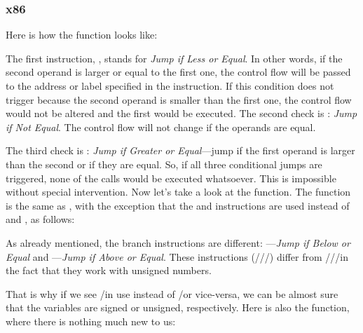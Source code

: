 \subsubsection{x86}


Here is how the  function looks like:




The first instruction, \JLE, stands for \emph{Jump if Less or Equal}. 
In other words, if the second operand is 
larger or equal to the first one, the control flow will be passed to the address or label specified in the instruction.
If this condition does not trigger because the second operand is smaller than the first one, the control flow would not be altered and the first \printf would be executed.
The second check is \JNE: \emph{Jump if Not Equal}.
The control flow will not change if the operands are equal.

The third check is \JGE: \emph{Jump if Greater or Equal}---jump if the first operand is larger than 
the second or if they are equal.
So, if all three conditional jumps are triggered, none of the \printf calls would be executed whatsoever. 
This is impossible without special intervention.
Now let's take a look at the  function.
The  function is the same as , with the exception that the \JBE and \JAE instructions
are used instead of \JLE and \JGE, as follows:




As already mentioned, the branch instructions are different:
\JBE---\emph{Jump if Below or Equal} and \JAE---\emph{Jump if Above or Equal}.
These instructions (/\JAE/\JB/\JBE) differ from \JG/\JGE/\JL/\JLE in the fact that they work with unsigned numbers.


That is why if we see \JG/\JL in use instead of /\JB or vice-versa, 
we can be almost sure that the variables are signed or unsigned, respectively.
Here is also the \main function, where there is nothing much new to us:

